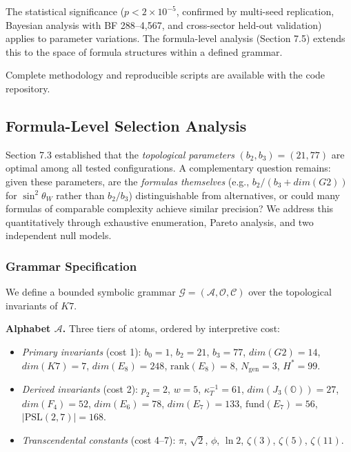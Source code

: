 \documentclass[11pt,a4paper]{article}
\newcommand{\E}{\mathrm{E}}
\newcommand{\Gtwo}{\mathrm{G}_2}
\newcommand{\Kseven}{K_7}
\newcommand{\dimE}{\mathrm{dim}}
\newcommand{\Weyl}{w}
\newcommand{\rank}{\mathrm{rank}}
\def\Gtwo{G2}%
\def\Kseven{K7}%
\def\E{E}%
\def\dimE{dim}%
\def\Weyl{w}%
\begin{document}
The statistical significance ($p < 2 \times 10^{-5}$, confirmed by multi-seed replication, Bayesian analysis with BF 288--4{,}567, and cross-sector held-out validation) applies to parameter variations. The formula-level analysis (Section 7.5) extends this to the space of formula structures within a defined grammar.

Complete methodology and reproducible scripts are available with the code repository.

\subsection{Formula-Level Selection Analysis}

Section 7.3 established that the \textit{topological parameters} $(b_2, b_3) = (21, 77)$ are optimal among all tested configurations. A complementary question remains: given these parameters, are the \textit{formulas themselves} (e.g., $b_2/(b_3 + \dimE(\Gtwo))$ for $\sin^2\theta_W$ rather than $b_2/b_3$) distinguishable from alternatives, or could many formulas of comparable complexity achieve similar precision? We address this quantitatively through exhaustive enumeration, Pareto analysis, and two independent null models.

\subsubsection{Grammar Specification}

We define a bounded symbolic grammar $\mathcal{G} = (\mathcal{A}, \mathcal{O}, \mathcal{C})$ over the topological invariants of $\Kseven$.

\textbf{Alphabet $\mathcal{A}$.} Three tiers of atoms, ordered by interpretive cost:

\begin{itemize}
\item \textit{Primary invariants} (cost 1): $b_0 = 1$, $b_2 = 21$, $b_3 = 77$, $\dimE(\Gtwo) = 14$, $\dimE(\Kseven) = 7$, $\dimE(\E_8) = 248$, $\rank(\E_8) = 8$, $N_{\mathrm{gen}} = 3$, $H^* = 99$.
\item \textit{Derived invariants} (cost 2): $p_2 = 2$, $\Weyl = 5$, $\kappa_T^{-1} = 61$, $\dimE(J_3(\mathbb{O})) = 27$, $\dimE(F_4) = 52$, $\dimE(\E_6) = 78$, $\dimE(\E_7) = 133$, $\mathrm{fund}(\E_7) = 56$, $|\mathrm{PSL}(2,7)| = 168$.
\item \textit{Transcendental constants} (cost 4--7): $\pi$, $\sqrt{2}$, $\phi$, $\ln 2$, $\zeta(3)$, $\zeta(5)$, $\zeta(11)$.
\end{itemize}
\end{document}
